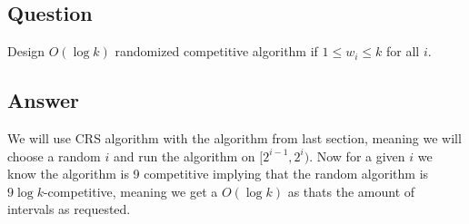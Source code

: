 \subsection*{Question}
Design $O(\log k)$ randomized competitive algorithm if $1 \leq  w_i \leq  k$ for all $i$.

\subsection*{Answer}
We will use CRS algorithm with the algorithm from last section, meaning we will choose a random $i$ and run the algorithm on $[2^{i-1},2^i)$. Now for a given $i$ we know the algorithm is 9 competitive implying that the random algorithm is $9\log k$-competitive, meaning we get a $O(\log k)$ as thats the amount of intervals as requested.
